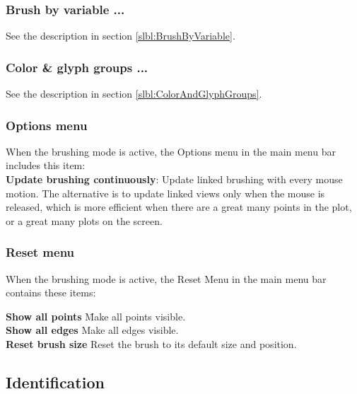\documentclass[11pt]{article}
\begin{document}
\subsubsection{Brush by variable ...}

See the description in section \ref{slbl:BrushByVariable}.

\subsubsection{Color \& glyph groups ...}

See the description in section \ref{slbl:ColorAndGlyphGroups}.

\subsubsection{Options menu}
%
When the brushing mode is active, the Options menu in the main
menu bar includes this item:
\medskip
\noindent
\\{\bf Update brushing continuously}: Update linked
  brushing with every mouse motion.  The alternative is to update linked
  views only when the mouse is released, which is more efficient when
  there are a great many points in the plot, or a great many plots on
  the screen.

\subsubsection{Reset menu}
%
When the brushing mode is active, the Reset Menu in the main
menu bar contains these items:

\begin{tabbing}
 {\bf Show all points} \hspace{.5in} \= Make all points visible. \\
 {\bf Show all edges} \> Make all edges visible. \\
 {\bf Reset brush size} \> Reset the brush to its default size and position. \\
\end{tabbing}
%

\subsection{Identification}
\label{slbl:Identify}
\end{document}
